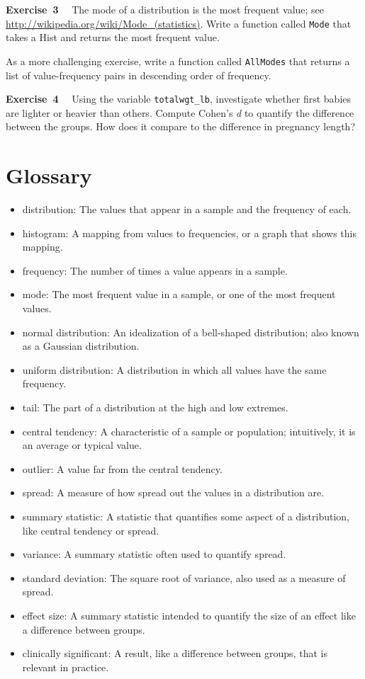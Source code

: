 \documentclass[]{book}
\providecommand{\tightlist}{%
  \setlength{\itemsep}{0pt}\setlength{\parskip}{0pt}}
\begin{document}
\textbf{Exercise~3}~~
The mode of a distribution is the most frequent value; see \url{http://wikipedia.org/wiki/Mode_(statistics)}. Write a function called \texttt{Mode} that takes a Hist and returns
the most frequent value.

As a more challenging exercise, write a function called \texttt{AllModes} that
returns a list of value-frequency pairs in descending order of
frequency.

\textbf{Exercise~4}~~
Using the variable \texttt{totalwgt\_lb}, investigate whether first babies are lighter or heavier
than others. Compute Cohen's \emph{d} to quantify the difference between the groups. How does it compare to
the difference in pregnancy length?

\hypertarget{glossary-1}{%
\section{Glossary}\label{glossary-1}}

\begin{itemize}
\tightlist
\item
  distribution: The values that appear
  in a sample and the frequency of each.
\item
  histogram: A mapping from values to
  frequencies, or a graph that shows this mapping.
\item
  frequency: The number of times a
  value appears in a sample.
\item
  mode: The most frequent value in a
  sample, or one of the most frequent values.
\item
  normal distribution: An idealization
  of a bell-shaped distribution; also known as a Gaussian
  distribution.
\item
  uniform distribution: A distribution
  in which all values have the same frequency.
\item
  tail: The part of a distribution at
  the high and low extremes.
\item
  central tendency: A characteristic of
  a sample or population; intuitively, it is an average or typical
  value.
\item
  outlier: A value far from the central
  tendency.
\item
  spread: A measure of how spread out
  the values in a distribution are.
\item
  summary statistic: A statistic that
  quantifies some aspect of a distribution, like central tendency or
  spread.
\item
  variance: A summary statistic often
  used to quantify spread.
\item
  standard deviation: The square root
  of variance, also used as a measure of spread.
\item
  effect size: A summary statistic
  intended to quantify the size of an effect like a difference between
  groups.
\item
  clinically significant: A result,
  like a difference between groups, that is relevant in practice.
\end{itemize}
\end{document}
